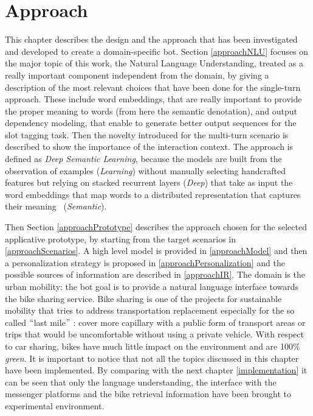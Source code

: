 
\chapter{Approach}
\label{approach}

This chapter describes the design and the approach that has been investigated and developed to create a domain-specific bot. Section \ref{approachNLU} focuses on the major topic of this work, the Natural Language Understanding, treated as a really important component independent from the domain, by giving a description of the most relevant choices that have been done for the single-turn approach. These include word embeddings, that are really important to provide the proper meaning to words (from here the semantic denotation), and output dependency modeling, that enable to generate better output sequences for the slot tagging task. Then the novelty introduced for the multi-turn scenario is described to show the importance of the interaction context. The approach is defined as \textit{Deep Semantic Learning}, because the models are built from the observation of examples (\textit{Learning}) without manually selecting handcrafted features but relying on stacked recurrent layers (\textit{Deep}) that take as input the word embeddings that map words to a distributed representation that captures their meaning~\cite{sahlgren2008distributional} (\textit{Semantic}).

Then Section \ref{approachPrototype} describes the approach chosen for the selected applicative prototype, by starting from the target scenarios in \ref{approachScenarios}. A high level model is provided in \ref{approachModel} and then a personalization strategy is proposed in \ref{approachPersonalization} and the possible sources of information are described in \ref{approachIR}. The domain is the urban mobility: the bot goal is to provide a natural language interface towards the bike sharing service. Bike sharing is one of the projects for sustainable mobility that tries to address transportation replacement especially for the so called $``$last mile$"$ : cover more capillary with a public form of transport areas or trips that would be uncomfortable without using a private vehicle. With respect to car sharing, bikes have much little impact on the environment and are 100$\%$  \textit{green}. It is important to notice that not all the topics discussed in this chapter have been implemented. By comparing with the next chapter \ref{implementation} it can be seen that only the language understanding, the interface with the messenger platforms and the bike retrieval information have been brought to experimental environment.

